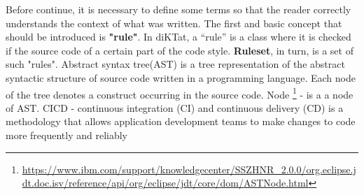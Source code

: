 Before continue, it is necessary to define some terms so that the reader correctly understands the context of what was written. The first and basic concept that should be introduced is \textbf{"rule"}. In diKTat, a “rule” is a class where it is checked if the source code of a certain part of the code style. \textbf{Ruleset}, in turn, is a set of such "rules". Abstract syntax tree(AST) is a tree representation of the abstract syntactic structure of source code written in a programming language. Each node of the tree denotes a construct occurring in the source code. Node \footnote{\url{ https://www.ibm.com/support/knowledgecenter/SSZHNR_2.0.0/org.eclipse.jdt.doc.isv/reference/api/org/eclipse/jdt/core/dom/ASTNode.html}} - is a a node of AST. CICD - continuous integration (CI) and continuous delivery (CD) is a methodology that allows application development teams to make changes to code more frequently and reliably